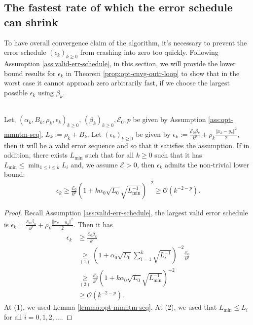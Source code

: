 \documentclass[12pt]{article}
\begin{document}
    \subsection{The fastest rate of which the error schedule can shrink}
        To have overall convergence claim of the algorithm, it's necessary to prevent the error schedule $(\epsilon_k)_{k \ge 0}$ from crashing into zero too quickly. 
        Following Assumption \ref{ass:valid-err-schedule}, in this section, we will provide the lower bound results for $\epsilon_k$ in Theorem \ref{prop:opt-cnvg-outr-loop} to show that in the worst case it cannot approach zero arbitrarily fast, if we choose the largest possible $\epsilon_k$ using $\beta_k$. 
        \begin{lemma}\;\label{lemma:err-schedule-lbnd}\\
            Let, $(\alpha_k, B_k, \rho_k, \epsilon_k)_{k \ge 0}$, $(\beta_k)_{k\ge 0}, \mathcal E_0, p$ be given by Assumption \ref{ass:opt-mmntm-seq}, $L_k := \rho_k + B_k$. 
            Let $(\epsilon_k)_{k \ge 0}$ be given by $\epsilon_k := \frac{\mathcal E_0 \beta_k}{k^p} + \rho_k \frac{\Vert x_k - y_k\Vert^2}{2}$, then it will be a valid error sequence and so that it satisfies the assumption. 
            If in addition, there exists $L_{\min}$ such that for all $k\ge 0$ such that it has $L_{\min} \le \min_{1 \le i \le k}L_i$ and, we assume $\mathcal E > 0$, then $\epsilon_k$ admits the non-trivial lower bound: 
            \begin{align*}
                \epsilon_k \ge \frac{\mathcal E_0}{k^p}\left(
                    1 + k \alpha_0 \sqrt{L_0} \sqrt{L_{\min}^{-1}}
                \right)^{-2} \ge \mathcal O(k^{-2-p}). 
            \end{align*}
        \end{lemma}
        \begin{proof}
            Recall Assumption \ref{ass:valid-err-schedule}, the largest valid error schedule is $\epsilon_k = \frac{\mathcal E_0 \beta_k}{k^p} + \rho_k \frac{\Vert x_k - y_k\Vert^2}{2}$. 
            Then it has 
            \begin{align*}
                \epsilon_k &\ge \frac{\mathcal E_0 \beta_k}{k^p}
                \\
                &\underset{(1)}{\ge} 
                \left(
                    1 + \alpha_0\sqrt{L_0}\sum_{i = 1}^{k}\sqrt{L_i^{-1}}
                \right)^{-2} 
                \frac{\mathcal E_0}{k^p}
                \\
                &\underset{(2)}{\ge}
                \frac{\mathcal E_0}{k^p}
                \left(
                    1 + k\alpha_0\sqrt{L_0}\sqrt{L_{\min}^{-1}}
                \right)^{-2} 
                \\
                &\ge \mathcal O(k^{-2-p}). 
            \end{align*}
            At (1), we used Lemma \ref{lemma:opt-mmntm-seq}. 
            At (2), we used that $L_{\min} \le L_i$ for all $i = 0, 1, 2, \ldots$. 
        \end{proof}
\end{document}
